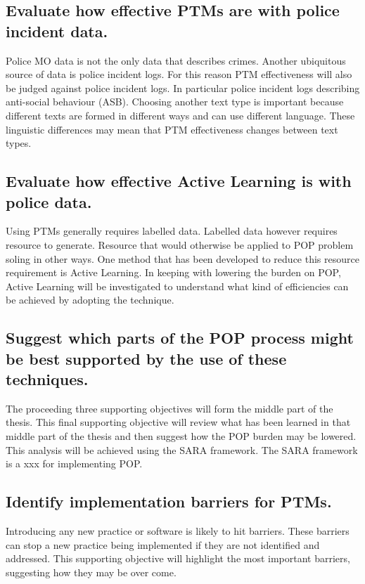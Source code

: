 \subsection{Evaluate how effective PTMs are with police incident data.} Police MO data is not the only data that describes crimes. Another ubiquitous source of data is police incident logs. For this reason PTM effectiveness will also be judged against police incident logs. In particular police incident logs describing anti-social behaviour (ASB). Choosing another text type is important because different texts are formed in different ways and can use different language. These linguistic differences may mean that PTM effectiveness changes between text types.  

\subsection{Evaluate how effective Active Learning is with police data.} Using PTMs generally requires labelled data. Labelled data however requires resource to generate. Resource that would otherwise be applied to POP problem soling in other ways. One method that has been developed to reduce this resource requirement is Active Learning.  In keeping with lowering the burden on POP, Active Learning will be investigated to understand what kind of efficiencies can be achieved by adopting the technique.

\subsection{Suggest which parts of the POP process might be best supported by the use of these techniques.} The proceeding three supporting objectives will form the middle part of the thesis. This final supporting objective will review what has been learned in that middle part of the thesis and then suggest how the POP burden may be lowered. This analysis will be achieved using the SARA framework. The SARA framework is a xxx for implementing POP.

\subsection{Identify implementation barriers for PTMs.} Introducing any new practice or software is likely to hit barriers. These barriers can stop a new practice being implemented if they are not identified and addressed. This  supporting objective will highlight the most important barriers, suggesting how they may be over come.




